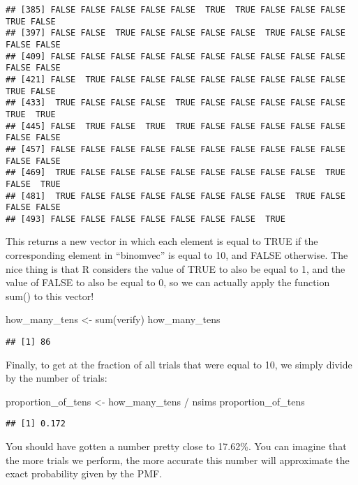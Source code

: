 \documentclass[
]{book}
\newenvironment{Shaded}{\begin{snugshade}}{\end{snugshade}}
\newcommand{\FunctionTok}[1]{\textcolor[rgb]{0.00,0.00,0.00}{#1}}
\newcommand{\NormalTok}[1]{#1}
\newcommand{\OtherTok}[1]{\textcolor[rgb]{0.56,0.35,0.01}{#1}}
\newcommand{\SpecialCharTok}[1]{\textcolor[rgb]{0.00,0.00,0.00}{#1}}
\begin{document}
\begin{verbatim}
## [385] FALSE FALSE FALSE FALSE FALSE  TRUE  TRUE FALSE FALSE FALSE  TRUE FALSE
## [397] FALSE FALSE  TRUE FALSE FALSE FALSE FALSE  TRUE FALSE FALSE FALSE FALSE
## [409] FALSE FALSE FALSE FALSE FALSE FALSE FALSE FALSE FALSE FALSE FALSE FALSE
## [421] FALSE  TRUE FALSE FALSE FALSE FALSE FALSE FALSE FALSE FALSE  TRUE FALSE
## [433]  TRUE FALSE FALSE FALSE  TRUE FALSE FALSE FALSE FALSE FALSE  TRUE  TRUE
## [445] FALSE  TRUE FALSE  TRUE  TRUE FALSE FALSE FALSE FALSE FALSE FALSE FALSE
## [457] FALSE FALSE FALSE FALSE FALSE FALSE FALSE FALSE FALSE FALSE FALSE FALSE
## [469]  TRUE FALSE FALSE FALSE FALSE FALSE FALSE FALSE FALSE  TRUE FALSE  TRUE
## [481]  TRUE FALSE FALSE FALSE FALSE FALSE FALSE FALSE  TRUE FALSE FALSE FALSE
## [493] FALSE FALSE FALSE FALSE FALSE FALSE FALSE  TRUE
\end{verbatim}

This returns a new vector in which each element is equal to TRUE if the corresponding element in ``binomvec'' is equal to 10, and FALSE otherwise. The nice thing is that R considers the value of TRUE to also be equal to 1, and the value of FALSE to also be equal to 0, so we can actually apply the function sum() to this vector!

\begin{Shaded}
\begin{Highlighting}[]
\NormalTok{how\_many\_tens }\OtherTok{\textless{}{-}} \FunctionTok{sum}\NormalTok{(verify)}
\NormalTok{how\_many\_tens}
\end{Highlighting}
\end{Shaded}

\begin{verbatim}
## [1] 86
\end{verbatim}

Finally, to get at the fraction of all trials that were equal to 10, we simply divide by the number of trials:

\begin{Shaded}
\begin{Highlighting}[]
\NormalTok{proportion\_of\_tens }\OtherTok{\textless{}{-}}\NormalTok{ how\_many\_tens }\SpecialCharTok{/}\NormalTok{ nsims}
\NormalTok{proportion\_of\_tens}
\end{Highlighting}
\end{Shaded}

\begin{verbatim}
## [1] 0.172
\end{verbatim}

You should have gotten a number pretty close to 17.62\%. You can imagine that the more trials we perform, the more accurate this number will approximate the exact probability given by the PMF.
\end{document}
